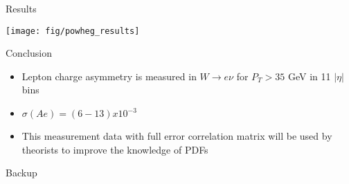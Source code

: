 \documentclass[t, 8pt]{beamer}
\begin{document}
\begin{frame}{Results}
  \begin{center}
    \texttt{[image: fig/powheg\_results]}
  \end{center}
\end{frame}

\begin{frame}{Conclusion}

  \begin{itemize}
    \item Lepton charge asymmetry is measured in $W\to e\nu$ for $P_T>35$ GeV in 11 $|\eta|$ bins
    \item $\sigma(Ae) = (6-13) x 10^{-3}$
    \item This measurement data with full error correlation matrix will be used by theorists to
    improve the knowledge of PDFs
  \end{itemize}

\end{frame}


\begin{frame}{Backup}
\end{frame}
\end{document}
